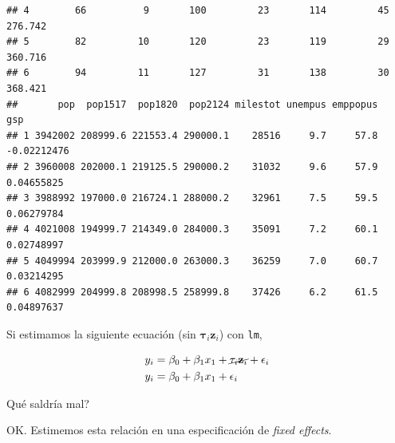 \documentclass[onesided]{article}\usepackage[]{graphicx}\usepackage[]{color}
\makeatletter
\newenvironment{kframe}{%
 \def\at@end@of@kframe{}%
 \ifinner\ifhmode%
  \def\at@end@of@kframe{\end{minipage}}%
  \begin{minipage}{\columnwidth}%
 \fi\fi%
 \def\FrameCommand##1{\hskip\@totalleftmargin \hskip-\fboxsep
 \colorbox{shadecolor}{##1}\hskip-\fboxsep
     \hskip-\linewidth \hskip-\@totalleftmargin \hskip\columnwidth}%
 \MakeFramed {\advance\hsize-\width
   \@totalleftmargin\z@ \linewidth\hsize
   \@setminipage}}%
 {\par\unskip\endMakeFramed%
 \at@end@of@kframe}
\newenvironment{knitrout}{}{} %
\makeatother
\begin{document}
\begin{knitrout}
\begin{kframe}
\begin{verbatim}
## 4        66          9       100         23       114         45 276.742
## 5        82         10       120         23       119         29 360.716
## 6        94         11       127         31       138         30 368.421
##       pop  pop1517  pop1820  pop2124 milestot unempus emppopus         gsp
## 1 3942002 208999.6 221553.4 290000.1    28516     9.7     57.8 -0.02212476
## 2 3960008 202000.1 219125.5 290000.2    31032     9.6     57.9  0.04655825
## 3 3988992 197000.0 216724.1 288000.2    32961     7.5     59.5  0.06279784
## 4 4021008 194999.7 214349.0 284000.3    35091     7.2     60.1  0.02748997
## 5 4049994 203999.9 212000.0 263000.3    36259     7.0     60.7  0.03214295
## 6 4082999 204999.8 208998.5 258999.8    37426     6.2     61.5  0.04897637
\end{verbatim}
\end{kframe}
\end{knitrout}

Si estimamos la siguiente ecuaci\'on (sin ${\mathbf \tau}_{i}{\mathbf z}_{i}$) con \texttt{lm},

\begin{equation}\label{lm}
\begin{split}
y_{i} & = \beta_{0} + {\mathbf \beta_{1}x_{1}} + \cancel{{\mathbf \tau}_{i}{\mathbf z}_{i}} + \epsilon_{i}\\
y_{i} & = \beta_{0} + {\mathbf \beta_{1}x_{1}}  + \epsilon_{i}
\end{split}
\end{equation}

{\color{red}Qu\'e saldr\'ia mal?}


OK. Estimemos esta relaci\'on en una especificaci\'on de \emph{fixed effects}.
\end{document}
